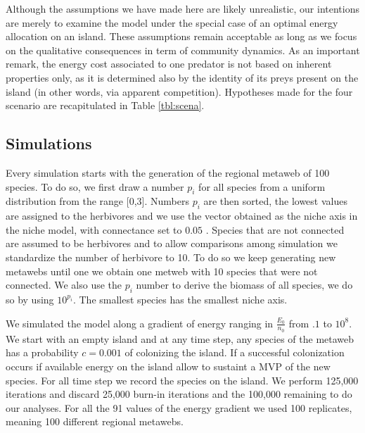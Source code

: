 Although the assumptions we have made here are likely unrealistic, our
intentions are merely to examine the model under the special case of an
optimal energy allocation on an island. These assumptions remain
acceptable as long as we focus on the qualitative consequences in term
of community dynamics. As an important remark, the energy cost
associated to one predator is not based on inherent properties only, as
it is determined also by the identity of its preys present on the island
(in other words, via apparent competition). Hypotheses made for the four
scenario are recapitulated in Table \ref{tbl:scena}.

\subsection{Simulations}\label{simulations}

Every simulation starts with the generation of the regional metaweb of
100 species. To do so, we first draw a number \(p_i\) for all species
from a uniform distribution from the range {[}0,3{]}. Numbers \(p_i\)
are then sorted, the lowest values are assigned to the herbivores and we
use the vector obtained as the niche axis in the niche model, with
connectance set to \(0.05\) \citep{Williams2000}. Species that are not
connected are assumed to be herbivores and to allow comparisons among
simulation we standardize the number of herbivore to 10. To do so we
keep generating new metawebs until one we obtain one metweb with 10
species that were not connected. We also use the \(p_i\) number to
derive the biomass of all species, we do so by using \(10^{p_i}\). The
smallest species has the smallest niche axis.

We simulated the model along a gradient of energy ranging in
\(\frac{E_0}{n_0}\) from \(.1\) to \(10^8\). We start with an empty
island and at any time step, any species of the metaweb has a
probability \(c=0.001\) of colonizing the island. If a successful
colonization occurs if available energy on the island allow to sustaint
a MVP of the new species. For all time step we record the species on the
island. We perform 125,000 iterations and discard 25,000 burn-in
iterations and the 100,000 remaining to do our analyses. For all the 91
values of the energy gradient we used 100 replicates, meaning 100
different regional metawebs.

